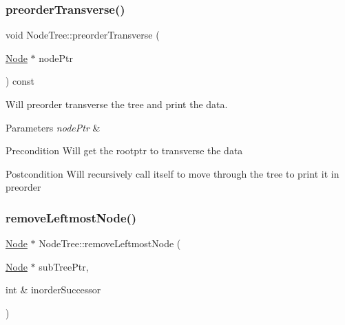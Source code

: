 \subsubsection{\texorpdfstring{preorder\+Transverse()}{preorderTransverse()}}
{\footnotesize\ttfamily void Node\+Tree\+::preorder\+Transverse (\begin{DoxyParamCaption}\item[{\mbox{\hyperlink{class_node}{Node}} $\ast$}]{node\+Ptr }\end{DoxyParamCaption}) const}



Will preorder transverse the tree and print the data. 


\begin{DoxyParams}{Parameters}
{\em node\+Ptr} & \\
\hline
\end{DoxyParams}
\begin{DoxyPrecond}{Precondition}
Will get the rootptr to transverse the data 
\end{DoxyPrecond}
\begin{DoxyPostcond}{Postcondition}
Will recursively call itself to move through the tree to print it in preorder 
\end{DoxyPostcond}
\mbox{\label{class_node_tree_a56b97fb5f2ea3ed32ec901e1a5589f89}} 
\subsubsection{\texorpdfstring{remove\+Leftmost\+Node()}{removeLeftmostNode()}}
{\footnotesize\ttfamily \mbox{\hyperlink{class_node}{Node}} $\ast$ Node\+Tree\+::remove\+Leftmost\+Node (\begin{DoxyParamCaption}\item[{\mbox{\hyperlink{class_node}{Node}} $\ast$}]{sub\+Tree\+Ptr,  }\item[{int \&}]{inorder\+Successor }\end{DoxyParamCaption})\hspace{0.3cm}{\ttfamily [protected]}}


